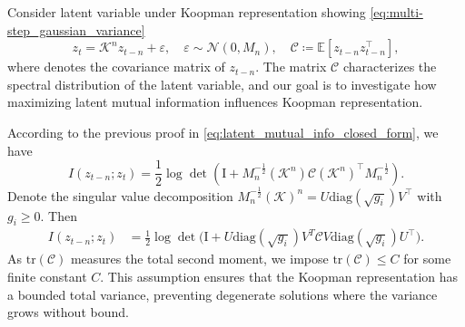 \documentclass{article} %
\begin{document}
\begin{proofwithframe}
Consider latent variable under Koopman representation showing \eqref{eq:multi-step_gaussian_variance} 
\begin{equation}
    z_{t} = \mathcal{K}^n z_{t-n} + \varepsilon, \quad \varepsilon \sim \mathcal{N}(0, M_n), \quad \mathcal{C} \coloneqq \mathbb{E}[z_{t-n} z_{t-n}^{\top}],
\end{equation}
where  denotes the covariance matrix of $z_{t-n}$. The matrix $\mathcal{C}$ characterizes the spectral distribution of the latent variable, and our goal is to investigate how maximizing latent mutual information influences Koopman representation. 

According to the previous proof in \eqref{eq:latent_mutual_info_closed_form}, we have 
\[
    I(z_{t-n}; z_{t}) = \frac{1}{2} \log \det(\mathrm{I} + M_n^{-\frac{1}{2}}(\mathcal{K}^{n})\mathcal{C}(\mathcal{K}^{n})^{\top}M_n^{-\frac{1}{2}}). 
\]
Denote the singular value decomposition $M_n^{-\frac{1}{2}} (\mathcal{K})^n =  U \text{diag}(\sqrt{g_i}) V^{\top}$ with $g_i \geq 0$. Then 
\begin{equation} \label{eq:SVD}
\begin{split} 
        I(z_{t-n}; z_{t}) & = \frac{1}{2} \log  \det \big(\mathrm{I} + U \text{diag}(\sqrt{g_i}) V^T \mathcal{C} V \text{diag}(\sqrt{g_i}) U^{\top}   \big).
\end{split}
\end{equation}
As $\mathrm{tr}(\mathcal{C})$ measures the total second moment, we impose $\mathrm{tr}(\mathcal{C}) \leq C$ for some finite constant $C$. This assumption ensures that the Koopman representation has a bounded total variance, preventing degenerate solutions where the variance grows without bound.


\end{proofwithframe}
\end{document}
